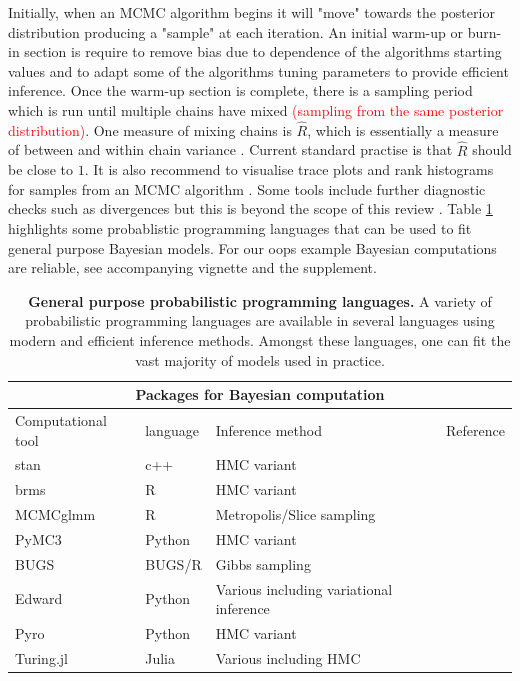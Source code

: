 \documentclass[12pt,english, journal=jpr, layout=twocolumn]{article}
\begin{document}
Initially, when an MCMC algorithm begins it will "move" towards the posterior distribution producing a "sample" at each iteration. An initial warm-up or burn-in section is require to remove bias due to dependence of the algorithms starting values and to adapt some of the algorithms tuning parameters to provide efficient inference. Once the warm-up section is complete, there is a sampling period which is run until multiple chains have mixed \textcolor{red}{(sampling from the same posterior distribution)}. One measure of mixing chains is $\hat{R}$, which is essentially a measure of between and within chain variance \citep{Vehtari::2019}. Current standard practise is that $\hat{R}$ should be close to $1$. It is also recommend to visualise trace plots and rank histograms for samples from an MCMC algorithm \citep{Gabry::2019}. Some tools include further diagnostic checks such as divergences but this is beyond the scope of this review \citep{Betancourt::2017}. Table \ref{table::bayesian computation} highlights some probablistic programming languages that can be used to fit general purpose Bayesian models. For our oops example Bayesian computations are reliable, see accompanying vignette and the supplement.

\begin{table}[ht]
	\centering
	
	\begin{tabular}{ |p{3cm}||p{2cm}|p{7cm}|p{5cm}|  }
		\hline
		\multicolumn{4}{|c|}{Packages for Bayesian computation} \\
		\hline
		Computational tool & language & Inference method & Reference\\
		\hline
		stan   & c++   &HMC variant&   \citep{Carpenter::2017}\\
		brms &   R  & HMC variant   & \citep{Burkner::2017}\\
		MCMCglmm & R & Metropolis/Slice sampling &  \citep{Hadfield::2010}\\
		PyMC3    & Python & HMC variant&  \citep{Salvatier::2016}\\
		BUGS &   BUGS/R  & Gibbs sampling & \citep{Lunn::2009}\\
		Edward&  Python  & Various including variational inference   &\citep{Tran::2016}\\
		Pyro & Python & HMC variant& \citep{Bingham::2019}\\
		Turing.jl & Julia & Various including HMC & \citep{Ge::2018}\\
		\hline
	\end{tabular}
\caption{\textbf{General purpose probabilistic programming languages.} A variety of probabilistic programming languages are available in several languages using modern and efficient inference methods. Amongst these languages, one can fit the vast majority of models used in practice.}
\label{table::bayesian computation}
\end{table}
\end{document}
